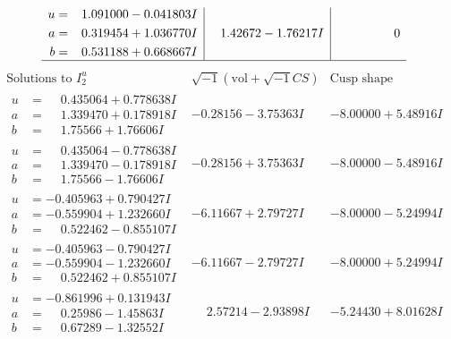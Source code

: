 \documentclass[1p]{elsarticle_modified}
\theoremstyle{definition}
\newcommand{\I}{\sqrt{-1}}
\begin{document}
$$\begin{array}{c|c|c}
\begin{aligned}
u &= \phantom{-}1.091000 - 0.041803 I \\
a &= \phantom{-}0.319454 + 1.036770 I \\
b &= \phantom{-}0.531188 + 0.668667 I\end{aligned}
 & \phantom{-}1.42672 - 1.76217 I & \phantom{-0.000000 } 0\\
 \hline 
 \end{array}$$\newpage$$\begin{array}{c|c|c}  
\text{Solutions to }I^u_{2}& \I (\text{vol} + \sqrt{-1}CS) & \text{Cusp shape}\\
 \hline 
\begin{aligned}
u &= \phantom{-}0.435064 + 0.778638 I \\
a &= \phantom{-}1.339470 + 0.178918 I \\
b &= \phantom{-}1.75566 + 1.76606 I\end{aligned}
 & -0.28156 - 3.75363 I & -8.00000 + 5.48916 I \\ \hline\begin{aligned}
u &= \phantom{-}0.435064 - 0.778638 I \\
a &= \phantom{-}1.339470 - 0.178918 I \\
b &= \phantom{-}1.75566 - 1.76606 I\end{aligned}
 & -0.28156 + 3.75363 I & -8.00000 - 5.48916 I \\ \hline\begin{aligned}
u &= -0.405963 + 0.790427 I \\
a &= -0.559904 + 1.232660 I \\
b &= \phantom{-}0.522462 - 0.855107 I\end{aligned}
 & -6.11667 + 2.79727 I & -8.00000 - 5.24994 I \\ \hline\begin{aligned}
u &= -0.405963 - 0.790427 I \\
a &= -0.559904 - 1.232660 I \\
b &= \phantom{-}0.522462 + 0.855107 I\end{aligned}
 & -6.11667 - 2.79727 I & -8.00000 + 5.24994 I \\ \hline\begin{aligned}
u &= -0.861996 + 0.131943 I \\
a &= \phantom{-}0.25986 - 1.45863 I \\
b &= \phantom{-}0.67289 - 1.32552 I\end{aligned}
 & \phantom{-}2.57214 - 2.93898 I & -5.24430 + 8.01628 I \\ \hline\begin{aligned}

\end{aligned}
\end{array}$$
\end{document}
